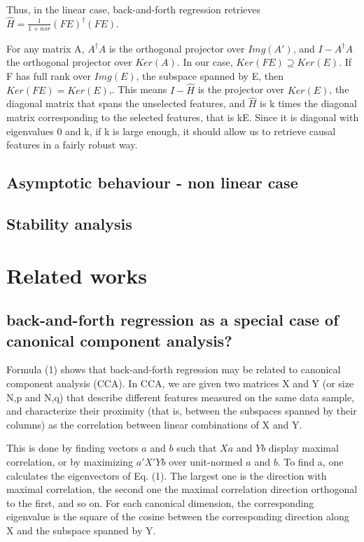 \documentclass{article}
\begin{document}
Thus, in the linear case, back-and-forth regression retrieves $\hat H = \frac{1}{1+nsr}(FE)^{\dagger}(FE)$.

For any matrix A, $A^\dagger A$ is the orthogonal projector over $Img(A')$, and $I-A^\dagger A$ the orthogonal projector over $Ker(A)$.
%
In our case, $Ker(FE)\supseteq Ker(E)$.
%
If F has full rank over $Img(E)$, the subspace spanned by E, then $Ker(FE) = Ker(E)$,.
%
This means $I - \hat H$ is the projector over $Ker(E)$, the diagonal matrix that spans the unselected features, and $\hat H$ is k times the diagonal matrix corresponding to the selected features, that is kE. Since it is diagonal with eigenvalues 0 and k, if k is large enough, it should allow us to retrieve causal features in a fairly robust way.

\subsection{Asymptotic behaviour - non linear case}

\subsection{Stability analysis}


\section{Related works}
\subsection{back-and-forth regression as a special case of canonical component analysis?}
Formula (1) shows that back-and-forth regression may be related to canonical component analysis (CCA).
%
In CCA, we are given two matrices X and Y (or size N,p and N,q) that describe different features measured on the same data sample, and characterize their proximity (that is, between the subspaces spanned by their columns) as the correlation between linear combinations of X and Y.

This is done by finding vectors $a$ and $b$ such that $Xa$ and $Yb$ display maximal correlation, or by maximizing $a'X'Yb$ over unit-normed $a$ and $b$.
%
To find a, one calculates the eigenvectors of Eq. (1).
%
The largest one is the direction with maximal correlation, the second one the maximal correlation direction orthogonal to the first, and so on.
%
For each canonical dimension, the corresponding eigenvalue is the square of the cosine between the corresponding direction along X and the subspace spanned by Y.
\end{document}
